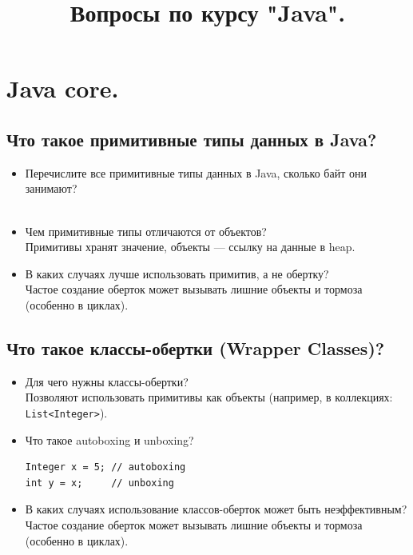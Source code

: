 \documentclass[a4paper,14pt]{article}
\title{Вопросы по курсу "Java".}
\date{}
\begin{document}
    \maketitle
    \section{Java core.}

    \subsection{Что такое примитивные типы данных в Java?}
    
    \begin{itemize}
        \item Перечислите все примитивные типы данных в Java, сколько байт они занимают?\\\\
        \item Чем примитивные типы отличаются от объектов? \\
        Примитивы хранят значение, объекты — ссылку на данные в heap.
        \item В каких случаях лучше использовать примитив, а не обертку? \\
        Частое создание оберток может вызывать лишние объекты и тормоза (особенно в циклах).
    \end{itemize}
    
    \subsection{Что такое классы-обертки (Wrapper Classes)?}

    \begin{itemize}
        \item Для чего нужны классы-обертки? \\
        Позволяют использовать примитивы как объекты (например, в коллекциях: \texttt{List<Integer>}).
        \item Что такое autoboxing и unboxing?
        \begin{lstlisting}[style=javastyle]
Integer x = 5; // autoboxing  
int y = x;     // unboxing
        \end{lstlisting}
        \item В каких случаях использование классов-оберток может быть неэффективным? \\
        Частое создание оберток может вызывать лишние объекты и тормоза (особенно в циклах).
    \end{itemize}
\end{document}
